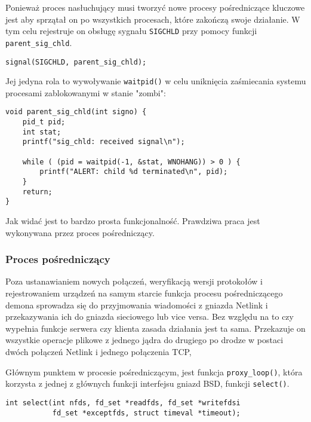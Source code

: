 \documentclass[10pt]{scrartcl}
\begin{document}
Ponieważ proces nasłuchujący musi tworzyć nowe procesy pośredniczące kluczowe jest aby sprzątał on po wszystkich procesach, które zakończą swoje działanie. W tym celu rejestruje on obsługę sygnału \texttt{SIGCHLD} przy pomocy funkcji \texttt{parent\_sig\_chld}.

\begin{verbatim}
signal(SIGCHLD, parent_sig_chld);
\end{verbatim}

Jej jedyna rola to wywoływanie \texttt{waitpid()} w celu uniknięcia zaśmiecania systemu procesami zablokowanymi w stanie "zombi":

\begin{verbatim}
void parent_sig_chld(int signo) {
    pid_t pid;
    int stat;
    printf("sig_chld: received signal\n");

    while ( (pid = waitpid(-1, &stat, WNOHANG)) > 0 ) {
        printf("ALERT: child %d terminated\n", pid);
    }
    return;
}
\end{verbatim}

Jak widać jest to bardzo prosta funkcjonalność. Prawdziwa praca jest wykonywana przez proces pośredniczący.

\subsubsection{Proces pośredniczący}

Poza ustanawianiem nowych połączeń, weryfikacją wersji protokołów i rejestrowaniem urządzeń na samym starcie funkcja procesu pośredniczącego demona sprowadza się do przyjmowania wiadomości z gniazda Netlink i przekazywania ich do gniazda sieciowego lub vice versa. Bez względu na to czy wypełnia funkcje serwera czy klienta zasada działania jest ta sama. Przekazuje on wszystkie operacje plikowe z jednego jądra do drugiego po drodze w postaci dwóch połączeń Netlink i jednego połączenia TCP,

Głównym punktem w procesie pośredniczącym, jest funkcja \texttt{proxy\_loop()}, która korzysta z jednej z głównych funkcji interfejsu gniazd BSD, funkcji \texttt{select()}.

\begin{verbatim}
int select(int nfds, fd_set *readfds, fd_set *writefdsi
           fd_set *exceptfds, struct timeval *timeout);
\end{verbatim}
\end{document}
